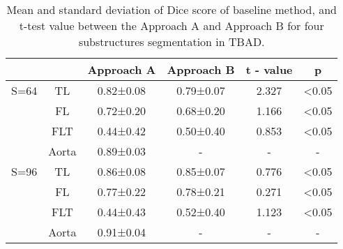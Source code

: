 \documentclass{article}
\begin{document}
\begin{table}[]
\centering
\caption{
Mean and standard deviation of Dice score of baseline method, and t-test value between the Approach A and Approach B for four substructures segmentation in TBAD.}
\begin{tabular}{@{}cccccc@{}}
\toprule
        &       & Approach A & Approach B & t - value & p               \\ \midrule
S=64 & TL    & 0.82±0.08  & 0.79±0.07  & 2.327     & \textless{}0.05 \\
        & FL    & 0.72±0.20  & 0.68±0.20  & 1.166     & \textless{}0.05 \\
        & FLT   & 0.44±0.42  & 0.50±0.40  & 0.853     & \textless{}0.05 \\
        & Aorta & 0.89±0.03  &    -       &     -    &       -         \\
S=96 & TL    & 0.86±0.08  & 0.85±0.07  & 0.776     & \textless{}0.05 \\
        & FL    & 0.77±0.22  & 0.78±0.21  & 0.271     & \textless{}0.05 \\
        & FLT   & 0.44±0.43  & 0.52±0.40  & 1.123     & \textless{}0.05 \\
        & Aorta & 0.91±0.04  &    -       &     -    &       -         \\ \bottomrule
\end{tabular}
\label{table:results-dice}
\end{table}
\end{document}
